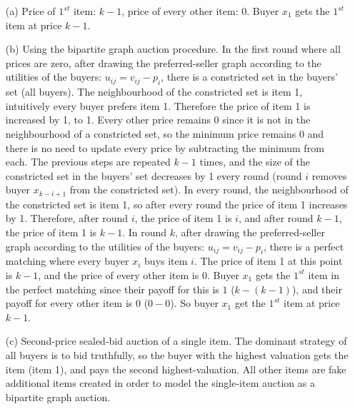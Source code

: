 \documentclass{article}
\begin{document}
\begin{enumerate}
	\begin{enumerate}
		\item[(a)] Price of $1^{st}$ item: $k-1$, price of every other item: $0$. Buyer $x_1$ gets the $1^{st}$ item at price $k-1$. 
		\item[(b)] Using the bipartite graph auction procedure. 
		In the first round where all prices are zero, 
		after drawing the preferred-seller graph according to the utilities of the buyers: $u_{ij} = v_{ij} - p_i$, 
		there is a constricted set in the buyers' set (all buyers). 
		The neighbourhood of the constricted set is item 1, intuitively every buyer prefers item 1. 
		Therefore the price of item 1 is increased by 1, to 1. 
		Every other price remains 0 since it is not in the neighbourhood of a constricted set, 
		so the minimum price remains 0 and there is no need to update every price by subtracting the minimum from each. 
		The previous steps are repeated $k-1$ times, and the size of the constricted set in the buyers' set decreases by 1 every round 
		(round $i$ removes buyer $x_{k-i+1}$ from the constricted set). 
		In every round, the neighbourhood of the constricted set is item 1, so after every round the price of item 1 increases by 1. 
		Therefore, after round $i$, the price of item 1 is $i$, and after round $k-1$, the price of item 1 is $k-1$. 
		In round $k$, after drawing the preferred-seller graph according to the utilities of the buyers: $u_{ij} = v_{ij} - p_i$, 
		there is a perfect matching where every buyer $x_i$ buys item $i$. 
		The price of item 1 at this point is $k-1$, and the price of every other item is $0$. 
		Buyer $x_1$ gets the $1^{st}$ item in the perfect matching since their payoff for this is $1$ ($k-(k-1)$), 
		and their payoff for every other item is $0$ ($0-0$). 
		So buyer $x_1$ get the $1^{st}$ item at price $k-1$. 
		\item[(c)] Second-price sealed-bid auction of a single item.  
		The dominant strategy of all buyers is to bid truthfully, 
		so the buyer with the highest valuation gets the item (item 1), and pays the second highest-valuation. 
		All other items are fake additional items created in order to model the single-item auction as a bipartite graph auction. 
	\end{enumerate}


\end{enumerate}
\end{document}
